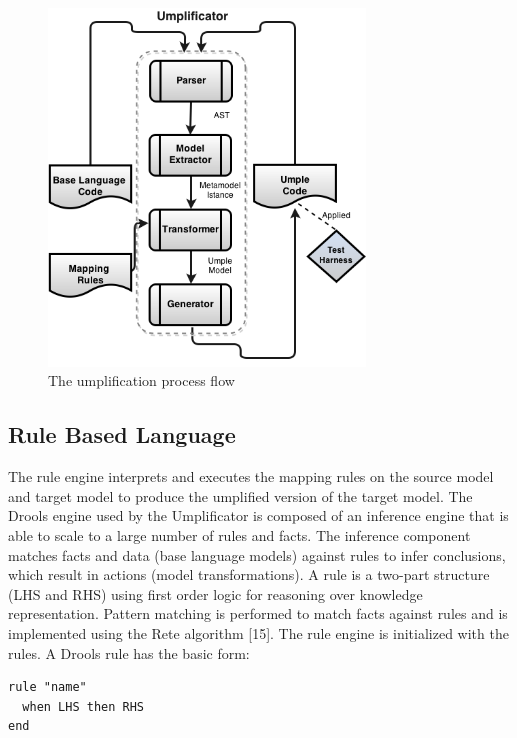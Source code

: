 \begin{figure}[h]
\centering
\includegraphics[width=0.75\textwidth]{Figures/Umplificator_ProcessFlow.png} 
\caption{The umplification process flow}
\label{fig:process_flow}
\end{figure}

\subsection{Rule Based Language}
The rule engine interprets and executes the mapping rules on the source model and target model to produce the umplified version of the target model.
The Drools engine used by the Umplificator is composed of an inference engine that is able to scale to a large number of rules and facts.  The inference component matches facts and data (base language models) against rules to infer conclusions, which result in actions (model transformations). A rule is a two-part structure (LHS and RHS) using first order logic for reasoning over knowledge representation. Pattern matching is performed to match facts against rules and is implemented using the Rete algorithm [15]. The rule engine is initialized with the rules. A Drools rule has the basic form: 

\begin{lstlisting}[language={drools},label={lst:drools}, caption=Basic rule in Drools] 
rule "name" 
  when LHS then RHS
end
\end{lstlisting}


